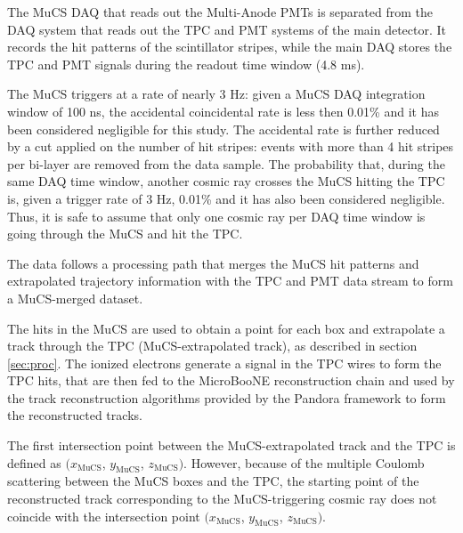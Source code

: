 \documentclass[a4paper,11pt]{article}
\begin{document}
The MuCS DAQ that reads out the Multi-Anode PMTs is separated from the DAQ system that reads out the TPC and PMT systems of the main detector. It records the hit patterns of the scintillator stripes, while the main DAQ stores the TPC and PMT signals during the readout time window (4.8 ms).

The MuCS triggers at a rate of nearly 3 Hz: given a MuCS DAQ integration window of 100 ns, the accidental coincidental rate is less then 0.01\% and it has been considered negligible for this study. The accidental rate is further reduced by a cut applied on the number of hit stripes: events with more than 4 hit stripes per bi-layer are removed from the data sample.
The probability that, during the same DAQ time window, another cosmic ray crosses the MuCS hitting the TPC is, given a trigger rate of 3 Hz, 0.01\% and it has also been considered negligible. Thus, it is safe to assume that only one cosmic ray per DAQ time window is going through the MuCS and hit the TPC.

The data follows a processing path that merges the MuCS hit patterns and extrapolated trajectory information with the TPC and PMT data stream to form a MuCS-merged dataset. %


The hits in the MuCS are used to obtain a point for each box and extrapolate a track through the TPC (MuCS-extrapolated track), as described in section \ref{sec:proc}. The ionized electrons generate a signal in the TPC wires to form the TPC hits, that are then fed to the MicroBooNE reconstruction chain and used by the track reconstruction algorithms provided by the Pandora framework \cite{pandora} to form the reconstructed tracks.

The first intersection point between the MuCS-extrapolated track and the TPC is defined as $(x_{\mathrm{MuCS}}$, $y_{\mathrm{MuCS}}$, $z_{\mathrm{MuCS}})$. However, because of the multiple Coulomb scattering between the MuCS boxes and the TPC, the starting point of the reconstructed track corresponding to the MuCS-triggering cosmic ray does not coincide with the intersection point $(x_{\mathrm{MuCS}}$, $y_{\mathrm{MuCS}}$, $z_{\mathrm{MuCS}})$.
\end{document}
